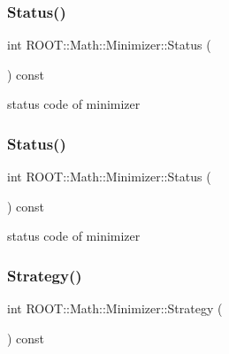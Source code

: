 \subsubsection{\texorpdfstring{Status()}{Status()}\hspace{0.1cm}{\footnotesize\ttfamily [2/3]}}
{\footnotesize\ttfamily int R\+O\+O\+T\+::\+Math\+::\+Minimizer\+::\+Status (\begin{DoxyParamCaption}{ }\end{DoxyParamCaption}) const\hspace{0.3cm}{\ttfamily [inline]}}



status code of minimizer 

\mbox{\label{classROOT_1_1Math_1_1Minimizer_a634833b3a6e525ef10605de5fd051499}} 
\subsubsection{\texorpdfstring{Status()}{Status()}\hspace{0.1cm}{\footnotesize\ttfamily [3/3]}}
{\footnotesize\ttfamily int R\+O\+O\+T\+::\+Math\+::\+Minimizer\+::\+Status (\begin{DoxyParamCaption}{ }\end{DoxyParamCaption}) const\hspace{0.3cm}{\ttfamily [inline]}}



status code of minimizer 

\mbox{\label{classROOT_1_1Math_1_1Minimizer_a7b2a1a1947d6cc627f4753424b77f881}} 
\subsubsection{\texorpdfstring{Strategy()}{Strategy()}\hspace{0.1cm}{\footnotesize\ttfamily [1/3]}}
{\footnotesize\ttfamily int R\+O\+O\+T\+::\+Math\+::\+Minimizer\+::\+Strategy (\begin{DoxyParamCaption}{ }\end{DoxyParamCaption}) const\hspace{0.3cm}{\ttfamily [inline]}}



